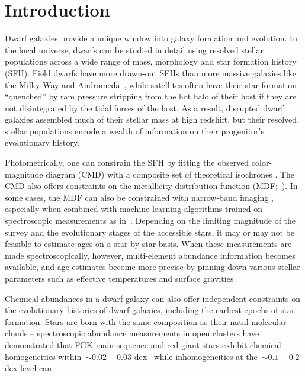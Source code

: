 \documentclass[foo.tex]{subfiles}
\begin{document}
\section{Introduction}
\label{sec:intro}

Dwarf galaxies provide a unique window into galaxy formation and evolution.
In the local universe, dwarfs can be studied in detail using resolved stellar
populations across a wide range of mass, morphology and star formation history
(SFH).
Field dwarfs have more drawn-out SFHs than more massive galaxies like the Milky
Way and Andromeda~\citep[e.g.,][]{Behroozi2019, GarrisonKimmel2019}, while
satellites often have their star formation ``quenched'' by ram pressure
stripping from the hot halo of their host
\citep*[see discussion in, e.g.,][]{Steyrleithner2020} if they are not
disintegrated by the tidal forces of the host.
As a result, disrupted dwarf galaxies assembled much of their stellar mass at
high redshift, but their resolved stellar populations encode a wealth of
information on their progenitor's evolutionary history.
\par
Photometrically, one can constrain the SFH by fitting the observed
color-magnitude diagram (CMD) with a composite set of theoretical isochrones
\citep[e.g.,][]{Dolphin2002, Weisz2014b}.
The CMD also offers constraints on the metallicity distribution function
(MDF;~\citealp*[e.g.,][]{Lianou2011}).
In some cases, the MDF can also be constrained with narrow-band imaging
\citep{Fu2022}, especially when combined with machine learning algorithms
trained on spectroscopic measurements as in~\citet{Whitten2011}.
Depending on the limiting magnitude of the survey and the evolutionary stages
of the accessible stars, it may or may not be feasible to estimate ages on a
star-by-star basis.
When these measurements are made spectroscopically, however, multi-element
abundance information becomes available, and age estimates become more precise
by pinning down various stellar parameters such as effective temperatures and
surface gravities.
\par
Chemical abundances in a dwarf galaxy can also offer independent constraints
on the evolutionary histories of dwarf galaxies, including the earliest epochs
of star formation.
Stars are born with the same composition as their natal molecular clouds --
spectroscopic abundance measurements in open clusters have demonstrated that
FGK main-sequence and red giant stars exhibit chemical homogeneities
within~$\sim$$0.02 - 0.03$ dex~\citep{DeSilva2006, Bovy2016, Liu2016b,
Casamiquela2020} while inhomogeneities at the~$\sim$$0.1 - 0.2$ dex level can
\end{document}
